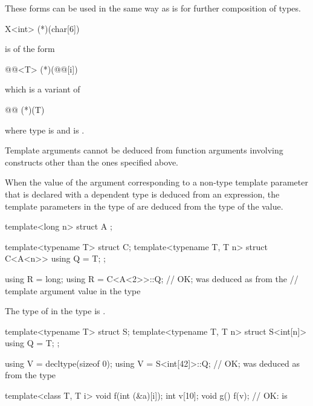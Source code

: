 \pnum
These forms can be used in the same way as
is for further composition of types.
\begin{example}
\begin{codeblock}
X<int> (*)(char[6])
\end{codeblock}
is of the form
\begin{codeblock}
@@<T> (*)(@@[i])
\end{codeblock}
which is a variant of
\begin{codeblock}
@@ (*)(T)
\end{codeblock}
where type is
and
is
.
\end{example}

\pnum
Template arguments cannot be deduced from function arguments involving
constructs other than the ones specified above.

\pnum
When the value of the argument
corresponding to a non-type template parameter 
that is declared with a dependent type
is deduced from an expression,
the template parameters in the type of 
are deduced from the type of the value.
\begin{example}
\begin{codeblock}
template<long n> struct A { };

template<typename T> struct C;
template<typename T, T n> struct C<A<n>> {
  using Q = T;
};

using R = long;
using R = C<A<2>>::Q;           // OK;  was deduced as  from the
                                // template argument value in the type 
\end{codeblock}
\end{example}

\pnum
The type of  in the type  is .
\begin{example}
\begin{codeblock}
template<typename T> struct S;
template<typename T, T n> struct S<int[n]> {
  using Q = T;
};

using V = decltype(sizeof 0);
using V = S<int[42]>::Q;        // OK;  was deduced as  from the type 
\end{codeblock}
\end{example}

\pnum
\begin{example}
\begin{codeblock}
template<class T, T i> void f(int (&a)[i]);
int v[10];
void g() {
  f(v);                         // OK:  is 
}
\end{codeblock}
\end{example}

